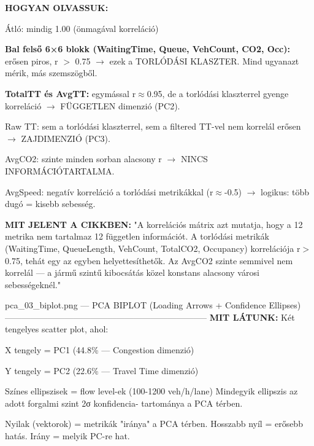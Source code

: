 \documentclass[11pt,a4paper]{article}
\begin{document}
\textbf{HOGYAN OLVASSUK:}
\par\noindent\hspace*{1em}\textbullet{} Átló: mindig 1.00 (önmagával korreláció)
\par\noindent\hspace*{1em}\textbullet{} \textbf{Bal felső 6×6 blokk (WaitingTime, Queue, VehCount, CO2, Occ):}
erősen piros, r $>$ 0.75 $\rightarrow$ ezek a TORLÓDÁSI KLASZTER.
Mind ugyanazt mérik, más szemszögből.
\par\noindent\hspace*{1em}\textbullet{} \textbf{TotalTT és AvgTT:} egymással r$\approx$0.95, de a torlódási klaszterrel
gyenge korreláció $\rightarrow$ FÜGGETLEN dimenzió (PC2).
\par\noindent\hspace*{1em}\textbullet{} Raw TT: sem a torlódási klaszterrel, sem a filtered TT-vel
nem korrelál erősen $\rightarrow$ ZAJDIMENZIÓ (PC3).
\par\noindent\hspace*{1em}\textbullet{} AvgCO2: szinte minden sorban alacsony r $\rightarrow$ NINCS INFORMÁCIÓTARTALMA.
\par\noindent\hspace*{1em}\textbullet{} AvgSpeed: negatív korreláció a torlódási metrikákkal (r$\approx$-0.5)
$\rightarrow$ logikus: több dugó = kisebb sebesség.

\textbf{MIT JELENT A CIKKBEN:}
"A korrelációs mátrix azt mutatja, hogy a 12 metrika nem
tartalmaz 12 független információt. A torlódási metrikák
(WaitingTime, QueueLength, VehCount, TotalCO2, Occupancy)
korrelációja r$>$0.75, tehát egy az egyben helyettesíthetők.
Az AvgCO2 szinte semmivel nem korrelál — a jármű szintű
kibocsátás közel konstans alacsony városi sebességeknél."

pca\_03\_biplot.png — PCA BIPLOT (Loading Arrows + Confidence Ellipses)
-----------------------------------------------------------------------
\textbf{MIT LÁTUNK:}
Két tengelyes scatter plot, ahol:
\par\noindent\hspace*{1em}\textbullet{} X tengely = PC1 (44.8\% — Congestion dimenzió)
\par\noindent\hspace*{1em}\textbullet{} Y tengely = PC2 (22.6\% — Travel Time dimenzió)
\par\noindent\hspace*{1em}\textbullet{} Színes ellipszisek = flow level-ek (100-1200 veh/h/lane)
Mindegyik ellipszis az adott forgalmi szint 2σ konfidencia-
tartománya a PCA térben.
\par\noindent\hspace*{1em}\textbullet{} Nyilak (vektorok) = metrikák "iránya" a PCA térben.
Hosszabb nyíl = erősebb hatás. Irány = melyik PC-re hat.
\end{document}
